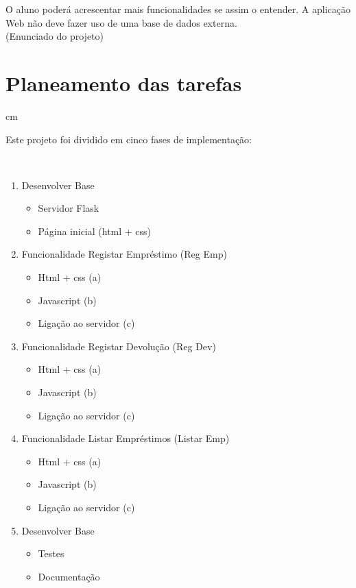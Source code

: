 \documentclass[12pt, a4paper, twoside]{article}
\begin{document}
O aluno poderá acrescentar mais funcionalidades se assim o entender. A aplicação Web não deve fazer uso de uma base de dados externa.\\
(Enunciado do projeto)

\newpage
\section{Planeamento das tarefas}
 cm

Este projeto foi dividido em cinco fases de implementação:

\\
\begin{enumerate}
	\item Desenvolver Base
  	\begin{itemize}
		\item Servidor Flask
  		\item Página inicial (html + css)
  	\end{itemize}
  	\item Funcionalidade Registar Empréstimo (Reg Emp)
  	\begin{itemize}
  		\item Html + css (a)
  		\item Javascript (b)
  		\item Ligação ao servidor (c)
	\end{itemize}
	\item Funcionalidade Registar Devolução (Reg Dev)
  	\begin{itemize}
  		\item Html + css (a)
  		\item Javascript (b)
  		\item Ligação ao servidor (c)
	\end{itemize}
	\item Funcionalidade Listar Empréstimos (Listar Emp)
  	\begin{itemize}
  		\item Html + css (a)
  		\item Javascript (b)
  		\item Ligação ao servidor (c)
	\end{itemize}
	\item Desenvolver Base
  	\begin{itemize}
  		\item Testes
  		\item Documentação
	\end{itemize}
\end{enumerate}
\end{document}
